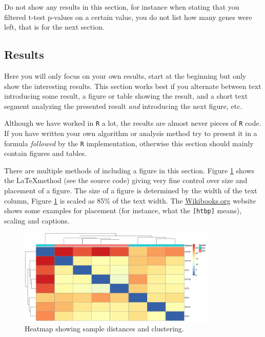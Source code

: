 Do not show any results in this section, for instance when stating that
you filtered t-test p-values on a certain value, you do not list how
many genes were left, that is for the next section.

\hypertarget{results}{%
\subsection{Results}\label{results}}

Here you will only focus on your own results, start at the beginning but
only show the interesting results. This section works best if you
alternate between text introducing some result, a figure or table
showing the result, and a short text segment analyzing the presented
result \emph{and} introducing the next figure, etc.

Although we have worked in \texttt{R} a lot, the results are almost
never pieces of \texttt{R} code. If you have written your own algorithm
or analysis method try to present it in a formula \emph{followed} by the
\texttt{R} implementation, otherwise this section should mainly contain
figures and tables.

There are multiple methods of including a figure in this section. Figure
\ref{figure:sample_heatmap} shows the \LaTeX method (see the source
code) giving very fine control over size and placement of a figure. The
size of a figure is determined by the width of the text column, Figure
\ref{figure:sample_heatmap} is scaled as 85\% of the text width. The
\href{https://en.wikibooks.org/wiki/LaTeX/Floats,_Figures_and_Captions\#Figures}{Wikibooks.org}
website shows some examples for placement (for instance, what the
\texttt{{[}htbp{]}} means), scaling and captions.

\begin{figure}[htbp]
  \centering
  \includegraphics[width=0.85\textwidth]{images/pheatmap.png}
  \caption{Heatmap showing sample distances and clustering.}
  \label{figure:sample_heatmap}
\end{figure}

